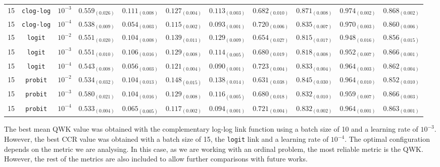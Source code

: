 \documentclass[journal]{IEEEtran}
\begin{document}
\begin{table}[!t]
\begin{tabular}{c@{\hskip 0.15cm}c@{\hskip 0.15cm}c@{\hskip 0.15cm}c@{\hskip 0.30cm}c@{\hskip 0.20cm}c@{\hskip 0.20cm}c@{\hskip 0.20cm}c@{\hskip 0.20cm}c@{\hskip 0.20cm}c@{\hskip 0.20cm}c}
			15 & \texttt{clog-log} & $10^{-3}$ & $0.559_{(0.026)}$ & $\mathit{0.111_{(0.008)}}$ & $0.127_{(0.004)}$ & $0.113_{(0.003)}$ & $0.682_{(0.010)}$ & $0.871_{(0.008)}$ & $\mathit{0.974_{(0.002)}}$ & $\mathbf{0.868_{(0.002)}}$\\
			15 & \texttt{clog-log} & $10^{-4}$ & $0.538_{(0.009)}$ & $0.054_{(0.003)}$ & $\mathbf{0.115_{(0.002)}}$ & $\mathit{0.093_{(0.001)}}$ & $0.720_{(0.006)}$ & $0.835_{(0.007)}$ & $0.970_{(0.003)}$ & $0.860_{(0.006)}$\\
			15 & \texttt{logit} & $10^{-2}$ & $0.551_{(0.020)}$ & $0.104_{(0.008)}$ & $0.139_{(0.011)}$ & $0.129_{(0.009)}$ & $0.654_{(0.027)}$ & $0.815_{(0.017)}$ & $0.948_{(0.016)}$ & $0.856_{(0.015)}$\\
			15 & \texttt{logit} & $10^{-3}$ & $0.551_{(0.010)}$ & $0.106_{(0.016)}$ & $0.129_{(0.008)}$ & $0.114_{(0.005)}$ & $0.680_{(0.019)}$ & $0.818_{(0.008)}$ & $0.952_{(0.007)}$ & $\mathit{0.866_{(0.001)}}$\\
			15 & \texttt{logit} & $10^{-4}$ & $0.543_{(0.008)}$ & $0.056_{(0.003)}$ & $0.121_{(0.004)}$ & $\mathbf{0.090_{(0.001)}}$ & $\mathbf{0.723_{(0.004)}}$ & $0.833_{(0.004)}$ & $0.964_{(0.003)}$ & $0.862_{(0.004)}$\\
			15 & \texttt{probit} & $10^{-2}$ & $0.534_{(0.032)}$ & $0.104_{(0.013)}$ & $0.148_{(0.015)}$ & $0.138_{(0.014)}$ & $0.631_{(0.038)}$ & $0.845_{(0.030)}$ & $0.964_{(0.010)}$ & $0.852_{(0.010)}$\\
			15 & \texttt{probit} & $10^{-3}$ & $\mathit{0.580_{(0.021)}}$ & $0.104_{(0.016)}$ & $0.129_{(0.008)}$ & $0.116_{(0.005)}$ & $0.680_{(0.018)}$ & $0.832_{(0.010)}$ & $0.959_{(0.007)}$ & $0.866_{(0.003)}$\\
			15 & \texttt{probit} & $10^{-4}$ & $0.533_{(0.004)}$ & $0.065_{(0.005)}$ & $0.117_{(0.002)}$ & $0.094_{(0.001)}$ & $\mathit{0.721_{(0.004)}}$ & $0.832_{(0.002)}$ & $0.964_{(0.001)}$ & $0.863_{(0.001)}$\\
			\hline
			\hline
		\end{tabular}
	\end{table}
	
	The best mean QWK value was obtained with the complementary log-log link function using a batch size of 10 and a learning rate of $10^{-3}$. However, the best CCR value was obtained with a batch size of 15, the \texttt{logit} link and a learning rate of $10^{-4}$. The optimal configuration depends on the metric we are analysing. In this case, as we are working with an ordinal problem, the most reliable metric is the QWK. However, the rest of the metrics are also included to allow further comparisons with future works.
	
\end{document}
